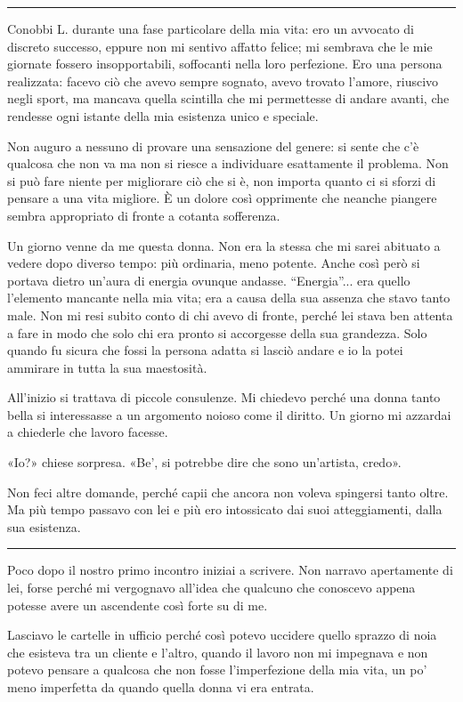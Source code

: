 \documentclass[a4paper,11pt,oneside,openright,final]{memoir}
\begin{document}
\plainbreak{1}

Conobbi L. durante una fase particolare della mia vita: ero un avvocato di
discreto successo, eppure non mi sentivo affatto felice; mi sembrava che le mie
giornate fossero insopportabili, soffocanti nella loro perfezione. Ero una
persona realizzata: facevo ciò che avevo sempre sognato, avevo trovato l'amore,
riuscivo negli sport, ma mancava quella scintilla che mi permettesse di andare
avanti, che rendesse ogni istante della mia esistenza unico e speciale.

Non auguro a nessuno di provare una sensazione del genere: si sente che c'è
qualcosa che non va ma non si riesce a individuare esattamente il problema. Non
si può fare niente per migliorare ciò che si è, non importa quanto ci si
sforzi di pensare a una vita migliore. È un dolore così opprimente che neanche
piangere sembra appropriato di fronte a cotanta sofferenza.

Un giorno venne da me questa donna. Non era la stessa che mi sarei abituato a
vedere dopo diverso tempo: più ordinaria, meno potente. Anche così però si
portava dietro un'aura di energia ovunque andasse. ``Energia''... era quello
l'elemento mancante nella mia vita; era a causa della sua assenza che stavo
tanto male. Non mi resi subito conto di chi avevo di fronte, perché lei stava
ben attenta a fare in modo che solo chi era pronto si accorgesse della sua
grandezza. Solo quando fu sicura che fossi la persona adatta si lasciò andare
e io la potei ammirare in tutta la sua maestosità.

All'inizio si trattava di piccole consulenze. Mi chiedevo perché una donna
tanto bella si interessasse a un argomento noioso come il diritto. Un giorno mi
azzardai a chiederle che lavoro facesse.

«Io?» chiese sorpresa. «Be', si potrebbe dire che sono un'artista, credo».

Non feci altre domande, perché capii che ancora non voleva spingersi tanto
oltre. Ma più tempo passavo con lei e più ero intossicato dai suoi
atteggiamenti, dalla sua esistenza.

\plainbreak{1}

Poco dopo il nostro primo incontro iniziai a scrivere. Non narravo apertamente
di lei, forse perché mi vergognavo all'idea che qualcuno che conoscevo appena
potesse avere un ascendente così forte su di me.

Lasciavo le cartelle in ufficio perché così potevo uccidere quello sprazzo di
noia che esisteva tra un cliente e l'altro, quando il lavoro non mi impegnava
e non potevo pensare a qualcosa che non fosse l'imperfezione della mia vita,
un po' meno imperfetta da quando quella donna vi era entrata.
\end{document}
